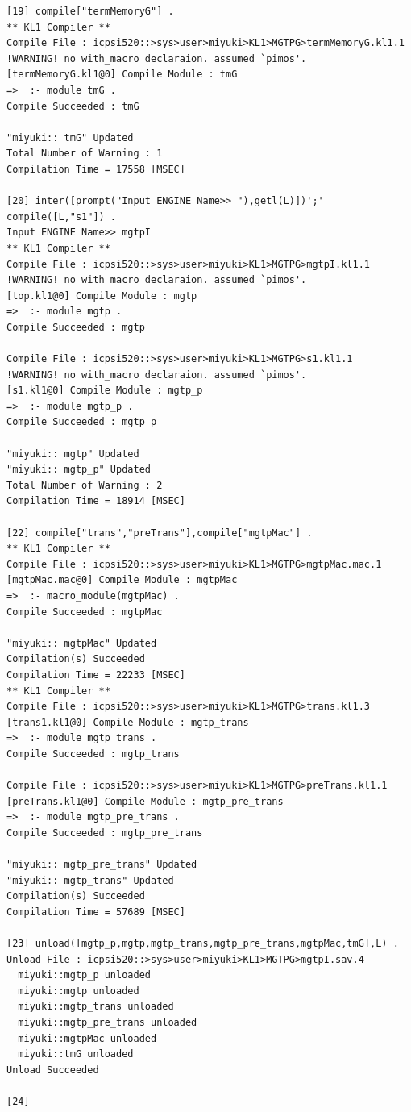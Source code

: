 {{{{\begin{verbatim}
[19] compile["termMemoryG"] .
** KL1 Compiler **
Compile File : icpsi520::>sys>user>miyuki>KL1>MGTPG>termMemoryG.kl1.1
!WARNING! no with_macro declaraion. assumed `pimos'.
[termMemoryG.kl1@0] Compile Module : tmG
=>  :- module tmG .
Compile Succeeded : tmG

"miyuki:: tmG" Updated
Total Number of Warning : 1
Compilation Time = 17558 [MSEC]

[20] inter([prompt("Input ENGINE Name>> "),getl(L)])';' compile([L,"s1"]) .
Input ENGINE Name>> mgtpI
** KL1 Compiler **
Compile File : icpsi520::>sys>user>miyuki>KL1>MGTPG>mgtpI.kl1.1
!WARNING! no with_macro declaraion. assumed `pimos'.
[top.kl1@0] Compile Module : mgtp
=>  :- module mgtp .
Compile Succeeded : mgtp

Compile File : icpsi520::>sys>user>miyuki>KL1>MGTPG>s1.kl1.1
!WARNING! no with_macro declaraion. assumed `pimos'.
[s1.kl1@0] Compile Module : mgtp_p
=>  :- module mgtp_p .
Compile Succeeded : mgtp_p

"miyuki:: mgtp" Updated
"miyuki:: mgtp_p" Updated
Total Number of Warning : 2
Compilation Time = 18914 [MSEC]

[22] compile["trans","preTrans"],compile["mgtpMac"] .
** KL1 Compiler **
Compile File : icpsi520::>sys>user>miyuki>KL1>MGTPG>mgtpMac.mac.1
[mgtpMac.mac@0] Compile Module : mgtpMac
=>  :- macro_module(mgtpMac) .
Compile Succeeded : mgtpMac

"miyuki:: mgtpMac" Updated
Compilation(s) Succeeded
Compilation Time = 22233 [MSEC]
** KL1 Compiler **
Compile File : icpsi520::>sys>user>miyuki>KL1>MGTPG>trans.kl1.3
[trans1.kl1@0] Compile Module : mgtp_trans
=>  :- module mgtp_trans .
Compile Succeeded : mgtp_trans

Compile File : icpsi520::>sys>user>miyuki>KL1>MGTPG>preTrans.kl1.1
[preTrans.kl1@0] Compile Module : mgtp_pre_trans
=>  :- module mgtp_pre_trans .
Compile Succeeded : mgtp_pre_trans

"miyuki:: mgtp_pre_trans" Updated
"miyuki:: mgtp_trans" Updated
Compilation(s) Succeeded
Compilation Time = 57689 [MSEC]

[23] unload([mgtp_p,mgtp,mgtp_trans,mgtp_pre_trans,mgtpMac,tmG],L) .
Unload File : icpsi520::>sys>user>miyuki>KL1>MGTPG>mgtpI.sav.4
  miyuki::mgtp_p unloaded
  miyuki::mgtp unloaded
  miyuki::mgtp_trans unloaded
  miyuki::mgtp_pre_trans unloaded
  miyuki::mgtpMac unloaded
  miyuki::tmG unloaded
Unload Succeeded

[24] 
\end{verbatim}

}}}}

